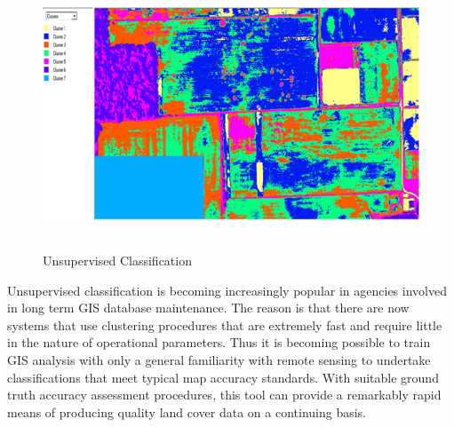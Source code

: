 \documentclass[document.tex]{subfiles}
\begin{document}
\begin{figure}[H]
	\begin{center}
		\includegraphics[height=8.0cm]{imgs/Unsupervised.png}
	\end{center}
	\caption{Unsupervised Classification}
	\label{fig: Unsupervised Classification}
\end{figure}
\noindent Unsupervised classification is becoming increasingly popular in agencies involved in
long term GIS database maintenance. The reason is that there are now systems that use
clustering procedures that are extremely fast and require little in the nature of operational parameters. Thus it is becoming possible to train GIS analysis with only a general
familiarity with remote sensing to undertake classifications that meet typical map accuracy standards. With suitable ground truth accuracy assessment procedures, this tool can provide a remarkably rapid means of producing quality land cover data on a continuing basis.
\end{document}
